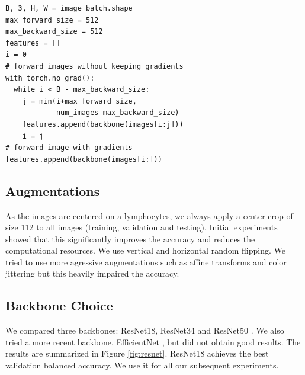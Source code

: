 \documentclass[final]{cvpr}
\begin{document}
	\begin{Verbatim}[fontsize=\footnotesize, samepage=true]
B, 3, H, W = image_batch.shape
max_forward_size = 512
max_backward_size = 512
features = []
i = 0
# forward images without keeping gradients
with torch.no_grad():
  while i < B - max_backward_size:
    j = min(i+max_forward_size,
            num_images-max_backward_size)
    features.append(backbone(images[i:j]))
    i = j
# forward image with gradients
features.append(backbone(images[i:]))
	\end{Verbatim}



\subsection{Augmentations}
As the images are centered on a lymphocytes, we always apply a center crop of size 112 to all images (training, validation and testing). Initial experiments showed that this significantly improves the accuracy and reduces the computational resources. We use vertical and horizontal random flipping. We tried to use more agressive augmentations such as affine transforms and color jittering but this heavily impaired the accuracy.

\subsection{Backbone Choice}
We compared three backbones: ResNet18, ResNet34 and ResNet50 \cite{resnet}. We also tried a more recent backbone, EfficientNet \cite{efn}, but did not obtain good results.
The results are summarized in Figure \ref{fig:resnet}. ResNet18 achieves the best validation balanced accuracy. We use it for all our subsequent experiments.
\end{document}
